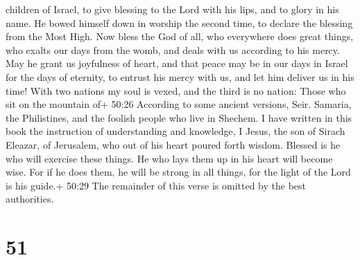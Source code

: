 children of Israel, to give blessing to the Lord with his lips, and to
glory in his name.  He bowed himself down in worship the
second time, to declare the blessing from the Most High. 
Now bless the God of all, who everywhere does great things, who exalts
our days from the womb, and deals with us according to his mercy.
 May he grant us joyfulness of heart, and that peace may be
in our days in Israel for the days of eternity,  to entrust
his mercy with us, and let him deliver us in his time! 
With two nations my soul is vexed, and the third is no nation:
 Those who sit on the mountain of+ 50:26 According to some
ancient versions, Seir. Samaria, the Philistines, and the foolish people
who live in Shechem.  I have written in this book the
instruction of understanding and knowledge, I Jesus, the son of Sirach
Eleazar, of Jerusalem, who out of his heart poured forth wisdom.
 Blessed is he who will exercise these things. He who lays
them up in his heart will become wise.  For if he does
them, he will be strong in all things, for the light of the Lord is his
guide.+ 50:29 The remainder of this verse is omitted by the best
authorities.

\hypertarget{section-13}{%
\section{51}\label{section-13}}

